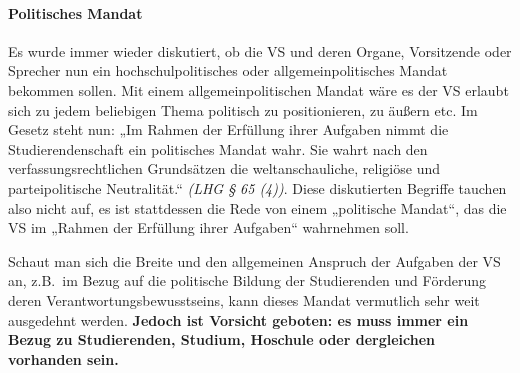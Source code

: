 \documentclass[
10pt,
a4paper,
twoside,								%
titlepage=false,							%
draft=false								%
]{scrartcl}
\begin{document}
\paragraph{Politisches Mandat}

Es wurde immer wieder diskutiert, ob die VS und deren Organe, Vorsitzende oder Sprecher nun ein hochschulpolitisches oder allgemeinpolitisches Mandat bekommen sollen.
Mit einem allgemeinpolitischen Mandat wäre es der VS erlaubt sich zu jedem beliebigen Thema politisch zu positionieren, zu äußern etc.
Im Gesetz steht nun: „Im Rahmen der Erfüllung ihrer Aufgaben nimmt die Studierendenschaft ein politisches Mandat wahr. Sie wahrt nach den verfassungsrechtlichen Grundsätzen die weltanschauliche, religiöse und parteipolitische Neutralität.“ \textit{(LHG § 65 (4))}.
Diese diskutierten Begriffe tauchen also nicht auf, es ist stattdessen die Rede von einem „politische Mandat“, das die VS im „Rahmen der Erfüllung ihrer Aufgaben“ wahrnehmen soll. 

Schaut man sich die Breite und den allgemeinen Anspruch der Aufgaben der VS an, z.B.~im Bezug auf die politische Bildung der Studierenden und Förderung deren Verantwortungsbewusstseins, kann dieses Mandat vermutlich sehr weit ausgedehnt werden. \textbf{Jedoch ist Vorsicht geboten: es muss immer ein Bezug zu Studierenden, Studium, Hoschule oder dergleichen vorhanden sein.}
\end{document}
